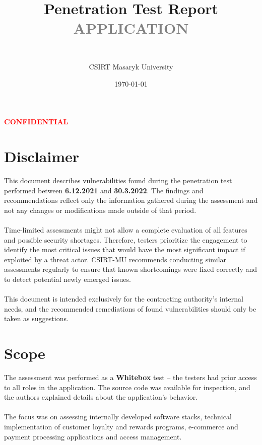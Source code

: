 \documentclass{article}
\title{\begin{center}
\Huge \textbf {Penetration Test Report\\ 
 \textcolor{gray}{APPLICATION}}
\end{center}}
\author{\\ \LARGE  CSIRT Masaryk University}
\date{\today}
\begin{document}
\maketitle
\begin{center}
\end{center}
\vspace*{\fill}
\begin{center}
\textbf{\textcolor{red}{CONFIDENTIAL}}
\end{center}
\newpage
\tableofcontents
\newpage
\section{Disclaimer}
This document describes vulnerabilities found during the penetration test performed between \textbf{6.12.2021} and \textbf{30.3.2022}. The findings and recommendations reflect only the information gathered during the assessment and not any changes or modifications made outside of that period.
\\
\\
Time-limited assessments might not allow a complete evaluation of all features and possible security shortages. Therefore, testers prioritize the engagement to identify the most critical issues that would have the most significant impact if exploited by a threat actor. CSIRT-MU recommends conducting similar assessments regularly to ensure that known shortcomings were fixed correctly and to detect potential newly emerged issues.
\\
\\
This document is intended exclusively for the contracting authority's internal needs, and the recommended remediations of found vulnerabilities should only be taken as suggestions.
\newpage

\section{Scope}

The assessment was performed as a \textbf{Whitebox} test – the testers had prior access to all roles in the application. The source code was available for inspection, and the authors explained details about the application’s behavior.
\\
\\
The focus was on assessing internally developed software stacks, technical implementation of customer loyalty and rewards programs, e-commerce and payment processing applications and access management. 
\end{document}
